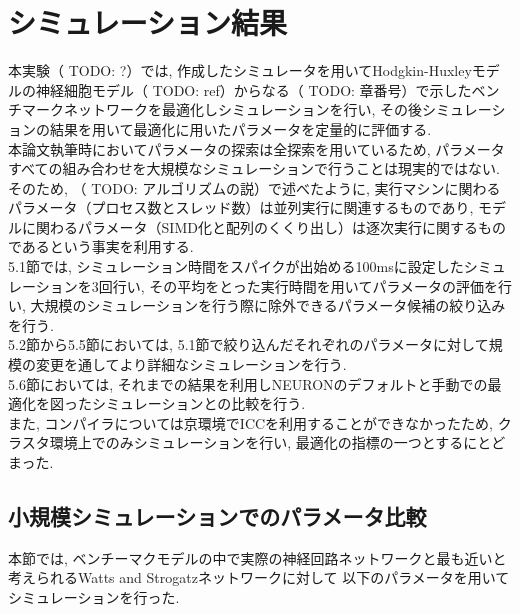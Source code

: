 \section{シミュレーション結果}
本実験（ TODO: ?）では, 作成したシミュレータを用いてHodgkin-Huxleyモデルの神経細胞モデル（ TODO: ref）からなる（ TODO: 章番号）で示したベンチマークネットワークを最適化しシミュレーションを行い,
その後シミュレーションの結果を用いて最適化に用いたパラメータを定量的に評価する.\\
本論文執筆時においてパラメータの探索は全探索を用いているため, パラメータすべての組み合わせを大規模なシミュレーションで行うことは現実的ではない.
そのため, （  TODO: アルゴリズムの説）で述べたように, 実行マシンに関わるパラメータ（プロセス数とスレッド数）は並列実行に関連するものであり,
モデルに関わるパラメータ（SIMD化と配列のくくり出し）は逐次実行に関するものであるという事実を利用する.\\
5.1節では, シミュレーション時間をスパイクが出始める100msに設定したシミュレーションを3回行い,
その平均をとった実行時間を用いてパラメータの評価を行い, 大規模のシミュレーションを行う際に除外できるパラメータ候補の絞り込みを行う.\\
5.2節から5.5節においては, 5.1節で絞り込んだそれぞれのパラメータに対して規模の変更を通してより詳細なシミュレーションを行う.\\
5.6節においては, それまでの結果を利用しNEURONのデフォルトと手動での最適化を図ったシミュレーションとの比較を行う.\\
また, コンパイラについては京環境でICCを利用することができなかったため, クラスタ環境上でのみシミュレーションを行い,
最適化の指標の一つとするにとどまった.\\

\subsection{小規模シミュレーションでのパラメータ比較}
本節では, ベンチーマクモデルの中で実際の神経回路ネットワークと最も近いと考えられるWatts and Strogatzネットワークに対して
以下のパラメータを用いてシミュレーションを行った.\\
